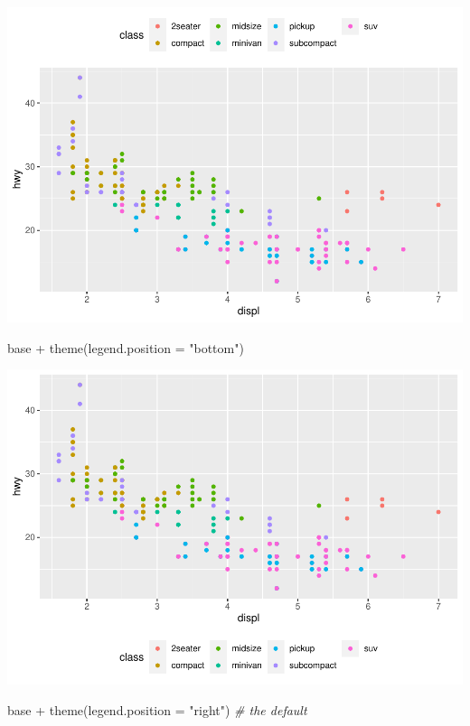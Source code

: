 \documentclass[
]{article}
\newenvironment{Shaded}{\begin{snugshade}}{\end{snugshade}}
\newcommand{\AttributeTok}[1]{\textcolor[rgb]{0.77,0.63,0.00}{#1}}
\newcommand{\CommentTok}[1]{\textcolor[rgb]{0.56,0.35,0.01}{\textit{#1}}}
\newcommand{\FunctionTok}[1]{\textcolor[rgb]{0.00,0.00,0.00}{#1}}
\newcommand{\NormalTok}[1]{#1}
\newcommand{\SpecialCharTok}[1]{\textcolor[rgb]{0.00,0.00,0.00}{#1}}
\newcommand{\StringTok}[1]{\textcolor[rgb]{0.31,0.60,0.02}{#1}}
\begin{document}
\includegraphics{Journal_files/figure-latex/unnamed-chunk-62-2.pdf}

\begin{Shaded}
\begin{Highlighting}[]
\NormalTok{base }\SpecialCharTok{+} \FunctionTok{theme}\NormalTok{(}\AttributeTok{legend.position =} \StringTok{"bottom"}\NormalTok{)}
\end{Highlighting}
\end{Shaded}

\includegraphics{Journal_files/figure-latex/unnamed-chunk-62-3.pdf}

\begin{Shaded}
\begin{Highlighting}[]
\NormalTok{base }\SpecialCharTok{+} \FunctionTok{theme}\NormalTok{(}\AttributeTok{legend.position =} \StringTok{"right"}\NormalTok{) }\CommentTok{\# the default}
\end{Highlighting}
\end{Shaded}
\end{document}
